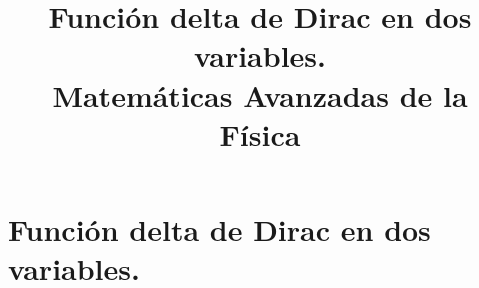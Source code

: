 
\usepackage{standalone}
\usepackage{geometry}
\geometry{top=1.25cm, bottom=1.5cm, left=1.25cm, right=1.25cm}
\newtheorem{defi}{{\it Definición}}[section]
\newtheorem{ejemplo}{{\it Ejemplo}}[section]
\newtheorem{propiedad}{{\it Propiedad}}[section]
\title{Función delta de Dirac en dos variables. \\ \large {Matemáticas Avanzadas de la Física}  \vspace{-1.5\baselineskip}}
\date{}

\renewcommand\labelenumii{\theenumi.{\arabic{enumii}}}
\maketitle
\fontsize{14}{14}\selectfont
\section{Función delta de Dirac en dos variables.}

